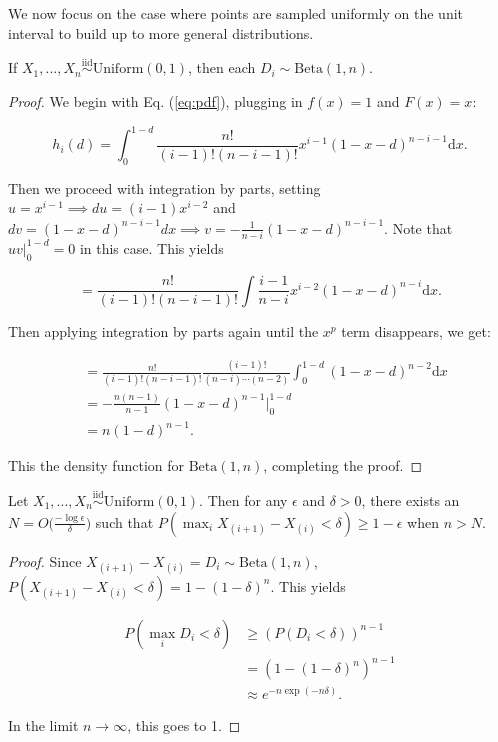 \documentclass[12pt]{article}
\begin{document}
We now focus on the case where points are sampled uniformly on the unit
interval to build up to more general distributions.

\begin{lemma}
If $X_1, ..., X_n \stackrel{\mathrm{iid}}{\sim}\mathrm{Uniform}(0, 1)$, then each $D_i \sim \mathrm{Beta}(1, n)$.
\end{lemma}

\begin{proof}
We begin with Eq. (\ref{eq:pdf}), plugging in $f(x) = 1$ and $F(x) = x$:

$$
h_i(d) = \int_0^{1-d} \frac{n!}{(i-1)! (n-i-1)!} x^{i-1} (1-x-d)^{n-i-1} \mathrm{d}x.
$$

Then we proceed with integration by parts, setting 
$u = x^{i-1} \implies du = (i-1) x^{i-2}$ and 
$dv = (1-x-d)^{n-i-1} dx \implies v = -\frac{1}{n-i} (1-x-d)^{n-i-1}$. 
Note that $u v |_0^{1-d} = 0$ in this case. This yields

$$
= \frac{n!}{(i-1)! (n-i-1)!} \int \frac{i-1}{n-i} x^{i-2} (1-x-d)^{n-i} \mathrm{d}x.
$$

Then applying integration by parts again until the $x^p$ term disappears, we get:

$$
\begin{aligned}
& = \frac{n!}{(i-1)! (n-i-1)!} \frac{(i-1)!}{(n-i) \cdots (n-2)} \int_0^{1-d} (1-x-d)^{n-2} \mathrm{d}x \\
& = -\frac{n (n-1)}{n-1} (1-x-d)^{n-1} \Big|_0^{1-d} \\
& = n (1 - d)^{n-1}.
\end{aligned}
$$

This the density function for $\mathrm{Beta}(1, n)$, completing the proof.
\end{proof}

\begin{lemma}
Let $X_1, ..., X_n \stackrel{\mathrm{iid}}{\sim}\mathrm{Uniform}(0, 1)$. 
Then for any $\epsilon$ and $\delta > 0$, 
there exists an $N = O \big(\frac{-\log \epsilon}{\delta} \big)$ such that 
$P(\max_i X_{(i+1)} - X_{(i)} < \delta) \geq 1 - \epsilon$ when $n > N$.
\end{lemma}

\begin{proof}
Since $X_{(i+1)} - X_{(i)} = D_i \sim \mathrm{Beta}(1, n)$, 
$P(X_{(i+1)} - X_{(i)} < \delta) = 1 - (1 - \delta)^n $. This yields

$$
\begin{aligned}
P(\max_i D_i < \delta) & \geq (P(D_i < \delta))^{n-1} \\
& = (1 - (1 - \delta)^n)^{n-1} \\
& \approx e^{-n \exp(-n \delta)}.
\end{aligned}
$$

In the limit $n \to \infty$, this goes to 1.
\end{proof}
\end{document}
